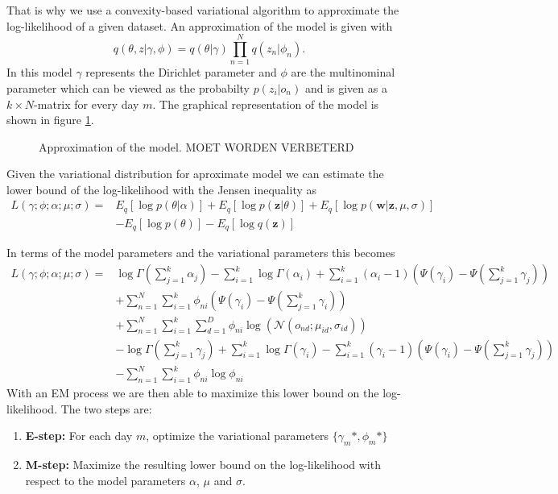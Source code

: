 \documentclass[11pt,a4paper]{article}
\begin{document}
That is why we use a convexity-based variational algorithm to approximate the log-likelihood of a given dataset. 
An approximation of the model is given with 
  \begin{equation}
   q(\theta,z|\gamma,\phi) = q(\theta|\gamma) \prod_{n=1}^N q(z_n|\phi_n).
  \end{equation}
In this model $\gamma$ represents the Dirichlet parameter and $\phi$ are the multinominal parameter which can be viewed as the probabilty $p(z_i|o_n)$ and is given as a $k \times N$-matrix for every day $m$. The graphical representation of the model is shown in figure \ref{fig:ModelApprox}.
  
 
\begin{figure}[h!]
\centering
\def\svgwidth{0.4\textwidth}

\caption{Approximation of the model. MOET WORDEN VERBETERD}
\label{fig:ModelApprox}
\end{figure}
 
  
  
  
  Given the variational distribution for aproximate model we can estimate the lower bound of the log-likelihood with the Jensen inequality as
  \begin{equation}
   \begin{split}
    L(\gamma;\phi;\alpha;\mu;\sigma) =& E_q[\log p(\theta|\alpha)] + E_q[\log p(\textbf{z}|\theta)] + E_q[\log p(\textbf{w}|\textbf{z},\mu,\sigma)] \\
   & -E_q[\log p(\theta)] - E_q[\log q(\textbf{z})]
   \end{split}
  \end{equation}

In terms of the model parameters and the variational parameters this becomes
\begin{equation}
  \begin{split}
 L(\gamma;\phi;\alpha;\mu;\sigma) =& \log \Gamma (\sum_{j=1}^k \alpha_j) - \sum_{i=1}^k \log \Gamma(\alpha_i) + \sum_{i=1}^k (\alpha_i-1)(\Psi(\gamma_i)-\Psi(\sum_{j=1}^k \gamma_j)) \\
 & + \sum_{n=1}^N \sum_{i=1}^k \phi_{ni} (\Psi(\gamma_i)-\Psi(\sum_{j=1}^k \gamma_i)) \\
  & + \sum_{n=1}^N \sum_{i=1}^k \sum_{d=1}^D \phi_{ni} \log( \mathcal{N}(o_{nd};\mu_{id},\sigma_{id})) \\
  & - \log \Gamma (\sum_{j=1}^k \gamma_j) + \sum_{i=1}^k \log \Gamma (\gamma_i) - \sum_{i=1}^k (\gamma_i -1)(\Psi(\gamma_i)-\Psi(\sum_{j=1}^k \gamma_j)) \\
 & - \sum_{n=1}^N \sum_{i=1}^k \phi_{ni} \log \phi_{ni}
  \end{split}
  \label{eq:likeli}
\end{equation}
With an EM process we are then able to maximize this lower bound on the log-likelihood. The two steps are:
  \begin{enumerate}
   \item \textbf{E-step:} For each day $m$, optimize the variational parameters $\{ \gamma_{m}*,\phi_{m}* \}$
   \item \textbf{M-step:} Maximize the resulting lower bound on the log-likelihood with respect to the model parameters $\alpha$, $\mu$ and $\sigma$.
  \end{enumerate}
  
\end{document}
